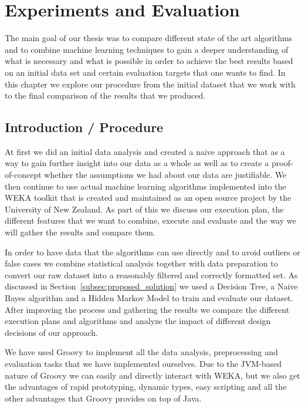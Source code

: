 \newpage
\section{Experiments and Evaluation}
\label{sec:experiments}

The main goal of our thesis was to compare different state of the art algorithms and to combine machine learning techniques to gain a deeper understanding of what is necessary and what is possible in order to achieve the best results based on an initial data set and certain evaluation targets that one wants to find. In this chapter we explore our procedure from the initial dataset that we work with to the final comparison of the results that we produced.

\subsection{Introduction / Procedure}

At first we did an initial data analysis and created a naive approach that as a way to gain further insight into our data as a whole as well as to create a proof-of-concept whether the assumptions we had about our data are justifiable. 
We then continue to use actual machine learning algorithms implemented into the WEKA toolkit that is created and maintained as an open source project by the University of New Zealand. As part of this we discuss our execution plan, the different features that we want to combine, execute and evaluate and the way we will gather the results and compare them.

In order to have data that the algorithms can use directly and to avoid outliers or false cases we combine statistical analysis together with data preparation to convert our raw dataset into a reasonably filtered and correctly formatted set. As discussed in Section~\ref{subsec:proposed_solution} we used a Decision Tree, a Naive Bayes algorithm and a Hidden Markov Model to train and evaluate our dataset. After improving the process and gathering the results we compare the different execution plans and algorithms and analyze the impact of different design decisions of our approach.

We have used Groovy to implement all the data analysis, preprocessing and evaluation tasks that we have implemented ourselves. Due to the JVM-based nature of Groovy we can easily and directly interact with WEKA, but we also get the advantages of rapid prototyping, dynamic types, easy scripting and all the other advantages that Groovy provides on top of Java. 

